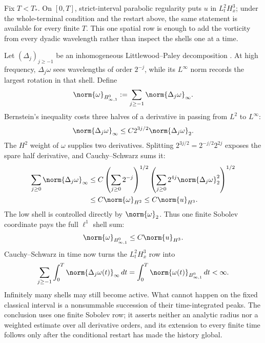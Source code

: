 Fix \(T<T_*\).  On \([0,T]\), strict-interval parabolic regularity puts
\(u\) in \(L^2_tH^3_x\); under the whole-terminal condition and the restart
above, the same statement is available for every finite \(T\).  This one
spatial row is enough to add the vorticity from every dyadic wavelength rather
than inspect the shells one at a time.

Let \((\Delta_j)_{j\geq-1}\) be an inhomogeneous Littlewood--Paley
decomposition \parencite[Chapter~2]{BahouriCheminDanchin2011}.  At high
frequency, \(\Delta_j\omega\) sees wavelengths of order \(2^{-j}\), while its
\(L^\infty\) norm records the largest rotation in that shell.  Define
\[
  \norm{\omega}_{B^0_{\infty,1}}
  :=\sum_{j\geq-1}\norm{\Delta_j\omega}_\infty.
\]
Bernstein's inequality costs three halves of a derivative in passing from
\(L^2\) to \(L^\infty\):
\[
  \norm{\Delta_j\omega}_\infty
  \leq C2^{3j/2}\norm{\Delta_j\omega}_2.
\]
The \(H^2\) weight of \(\omega\) supplies two derivatives.  Splitting
\(2^{3j/2}=2^{-j/2}2^{2j}\) exposes the spare half derivative, and
Cauchy--Schwarz sums it:
\begin{align*}
  \sum_{j\geq0}\norm{\Delta_j\omega}_\infty
  &\leq
  C\left(\sum_{j\geq0}2^{-j}\right)^{1/2}
  \left(\sum_{j\geq0}2^{4j}\norm{\Delta_j\omega}_2^2\right)^{1/2}
  \\
  &\leq C\norm{\omega}_{H^2}
  \leq C\norm{u}_{H^3}.
\end{align*}
The low shell is controlled directly by \(\norm{\omega}_2\).  Thus one finite
Sobolev coordinate pays the full \(\ell^1\) shell sum:
\begin{equation}\label{eq:VorticityBesovFromHThree}
  \norm{\omega}_{B^0_{\infty,1}}
  \leq C\norm{u}_{H^3}.
\end{equation}
Cauchy--Schwarz in time now turns the \(L^2_tH^3_x\) row into
\begin{equation}\label{eq:FiniteDyadicVorticityAction}
  \sum_{j\geq-1}
  \int_0^{T}\norm{\Delta_j\omega(t)}_\infty\,dt
  =\int_0^{T}\norm{\omega(t)}_{B^0_{\infty,1}}\,dt
  <\infty.
\end{equation}
Infinitely many shells may still become active.  What cannot happen on the
fixed classical interval is a nonsummable succession of their time-integrated
peaks.  The conclusion uses one finite Sobolev row; it asserts neither an
analytic radius nor a weighted estimate over all derivative orders, and its
extension to every finite time follows only after the conditional restart has
made the history global.

